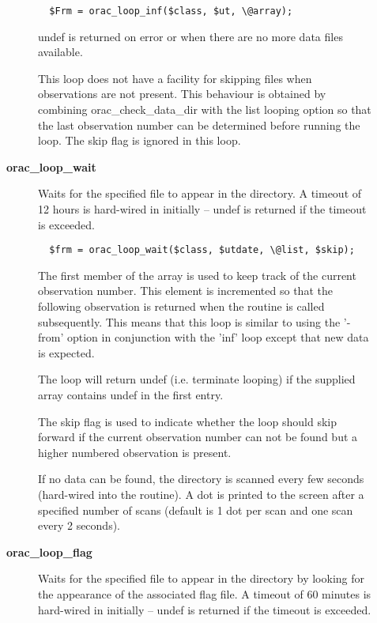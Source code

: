 \begin{description}
\begin{description}
\begin{verbatim}
  $Frm = orac_loop_inf($class, $ut, \@array);
\end{verbatim}


undef is returned on error or when there are no more data files
available.



This loop does not have a facility for skipping files when observations
are not present. This behaviour is obtained by combining 
orac\_check\_data\_dir with the list looping option so that the last
observation number can be determined before running the loop. The skip
flag is ignored in this loop.


\item[{\textbf{orac\_loop\_wait}}] \mbox{}

Waits for the specified file to appear in the directory.
A timeout of 12 hours is hard-wired in initially -- undef
is returned if the timeout is exceeded.

\begin{verbatim}
  $frm = orac_loop_wait($class, $utdate, \@list, $skip);
\end{verbatim}


The first member of the array is used to keep track of the
current observation number. This element is incremented so that
the following observation is returned when the routine is called
subsequently. This means that this loop is similar to using the
'-from' option in conjunction with the 'inf' loop except that
new data is expected.



The loop will return undef (i.e. terminate looping) if the
supplied array contains undef in the first entry.



The skip flag is used to indicate whether the loop should skip
forward if the current observation number can not be found
but a higher numbered observation is present.



If no data can be found, the directory is scanned every few seconds
(hard-wired into the routine). A dot is printed to the screen after
a specified number of scans (default is 1 dot per scan and one scan every
2 seconds).


\item[{\textbf{orac\_loop\_flag}}] \mbox{}

Waits for the specified file to appear in the directory
by looking for the appearance of the associated flag file.
A timeout of 60 minutes is hard-wired in initially -- undef
is returned if the timeout is exceeded.


\end{description}
\end{description}
